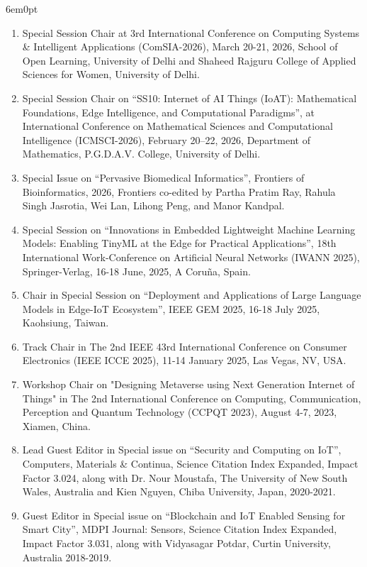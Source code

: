 \documentclass[11pt,a4paper]{moderncv}
\begin{document}
\begin{adjustwidth}{6em}{0pt}
\begin{enumerate}
		\item Special Session Chair at 3rd International Conference on Computing Systems \& Intelligent Applications (ComSIA-2026), March 20-21, 2026, School of Open Learning, University of Delhi and Shaheed Rajguru College of Applied Sciences for Women, University of Delhi.
		
		\item Special Session Chair on “SS10: Internet of AI Things (IoAT): Mathematical Foundations, Edge Intelligence, and Computational Paradigms”, at International Conference on Mathematical Sciences and Computational Intelligence (ICMSCI-2026), February 20–22, 2026, Department of Mathematics, P.G.D.A.V. College, University of Delhi.
		
		\item Special Issue on “Pervasive Biomedical Informatics”, Frontiers of Bioinformatics, 2026, Frontiers co-edited by Partha Pratim Ray, Rahula Singh Jasrotia, Wei Lan, Lihong Peng, and Manor Kandpal.
		
		\item Special Session on “Innovations in Embedded Lightweight Machine Learning Models: Enabling TinyML at the Edge for Practical Applications”, 18th International Work-Conference on Artificial Neural Networks (IWANN 2025), Springer-Verlag, 16-18 June, 2025, A Coruña, Spain.
		
		\item Chair in Special Session on “Deployment and Applications of Large Language Models in Edge-IoT Ecosystem”, IEEE GEM 2025, 16-18 July 2025, Kaohsiung, Taiwan.
		
		\item Track Chair in The 2nd IEEE 43rd International Conference on Consumer Electronics (IEEE ICCE 2025), 11-14 January 2025, Las Vegas, NV, USA.
		
		\item Workshop Chair on "Designing Metaverse using Next Generation Internet of Things" in The 2nd International Conference on Computing, Communication, Perception and Quantum Technology (CCPQT 2023), August 4-7, 2023, Xiamen, China.
		
		\item Lead Guest Editor in Special issue on “Security and Computing on IoT”, Computers, Materials \& Continua, Science Citation Index Expanded, Impact Factor 3.024, along with Dr. Nour Moustafa, The University of New South Wales, Australia and Kien Nguyen, Chiba University, Japan, 2020-2021.
		
		\item Guest Editor in Special issue on “Blockchain and IoT Enabled Sensing for Smart City”, MDPI Journal: Sensors, Science Citation Index Expanded, Impact Factor 3.031, along with Vidyasagar Potdar, Curtin University, Australia 2018-2019.
		

\end{enumerate}
\end{adjustwidth}
\end{document}
